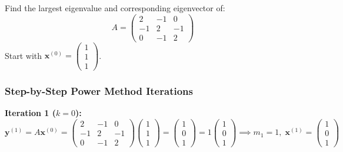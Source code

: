 \begin{examplebox}
Find the largest eigenvalue and corresponding eigenvector of:
\begin{equation}
    A = \begin{pmatrix}
    2 & -1 & 0 \\
    -1 & 2 & -1 \\
    0 & -1 & 2
    \end{pmatrix}
\end{equation}
Start with $\mathbf{x}^{(0)} = \begin{pmatrix} 1 \\ 1 \\ 1 \end{pmatrix}$.
\end{examplebox}

\subsubsection*{Step-by-Step Power Method Iterations}

\textbf{Iteration 1 ($k = 0$):}
\begin{equation}
    \mathbf{y}^{(1)} = A \mathbf{x}^{(0)} = \begin{pmatrix} 2 & -1 & 0 \\ -1 & 2 & -1 \\ 0 & -1 & 2 \end{pmatrix} \begin{pmatrix} 1 \\ 1 \\ 1 \end{pmatrix} = \begin{pmatrix} 1 \\ 0 \\ 1 \end{pmatrix} = 1 \begin{pmatrix} 1 \\ 0 \\ 1 \end{pmatrix} \implies m_1 = 1, \; \mathbf{x}^{(1)} = \begin{pmatrix} 1 \\ 0 \\ 1 \end{pmatrix}
\end{equation}

